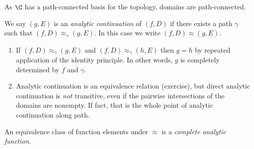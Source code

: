 \documentclass[a4paper]{article}
\begin{document}
\begin{remark}
  As \(\C\) has a path-connected basis for the topology, domains are path-connected.
\end{remark}

\begin{definition}
  We say \((g, E)\) is an \emph{analytic continuation} of \((f, D)\) if there exists a path \(\gamma\) such that \((f, D) \approx_\gamma (g, E)\). In this case we write \((f, D) \approx (g, E)\).
\end{definition}

\begin{remark}\leavevmode
  \begin{enumerate}
  \item If \((f, D) \approx_\gamma (g, E)\) and \((f, D) \approx_\gamma (h, E)\) then \(g = h\) by repeated application of the identity principle. In other words, \(g\) is completely determined by \(f\) and \(\gamma\).
  \item Analytic continuation is an equivalence relation (exercise), but direct analytic continuation is \emph{not} transitive, even if the pairwise intersections of the domains are nonempty. If fact, that is the whole point of analytic continuation along path.
  \end{enumerate}
\end{remark}

\begin{definition}
  An equivalence class of function elements under \(\approx\) is a \emph{complete analytic function}.
\end{definition}
\end{document}
